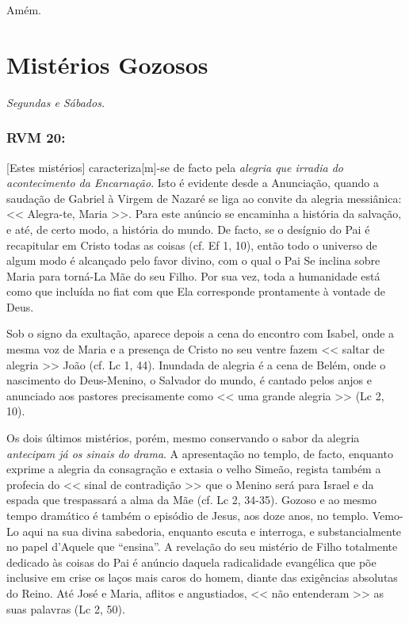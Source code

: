 \documentclass[10pt,a5paper]{book}
\newcommand{\from}[1]{\subsection*{#1}}
\begin{document}
Amém.


\chapter{Mistérios Gozosos}

\emph{Segundas e Sábados.}

\from{RVM 20:}

[Estes mistérios] caracteriza[m]-se de facto pela \emph{alegria que irradia do acontecimento da Encarnação}.
Isto é evidente desde a Anunciação, quando a saudação de Gabriel à Virgem de Nazaré se liga ao convite da alegria messiânica:
<< Alegra-te, Maria >>.
Para este anúncio se encaminha a história da salvação, e até, de certo modo, a história do mundo.
De facto, se o desígnio do Pai é recapitular em Cristo todas as coisas (cf. Ef 1, 10), então todo o
universo de algum modo é alcançado pelo favor divino, com o qual o Pai Se inclina sobre Maria
para torná-La Mãe do seu Filho.
Por sua vez, toda a humanidade está como que incluída no fiat com que Ela corresponde prontamente à vontade de Deus.

Sob o signo da exultação, aparece depois a cena do encontro com Isabel, onde a mesma voz de Maria e a presença de Cristo no seu ventre fazem << saltar de alegria >> João (cf. Lc 1, 44).
Inundada de alegria é a cena de Belém, onde o nascimento do Deus-Menino, o Salvador do mundo, é cantado pelos anjos e anunciado aos pastores precisamente como << uma grande alegria >> (Lc 2, 10).

Os dois últimos mistérios, porém, mesmo conservando o sabor da alegria \emph{antecipam já os sinais do drama}.
A apresentação no templo, de facto, enquanto exprime a alegria da consagração e extasia o velho Simeão, regista também a profecia do << sinal de contradição >> que o Menino será para Israel e da espada que trespassará a alma da Mãe (cf. Lc 2, 34-35).
Gozoso e ao mesmo tempo dramático é também o episódio de Jesus, aos doze anos, no templo.
Vemo-Lo aqui na sua divina sabedoria, enquanto escuta e interroga, e substancialmente no papel d'Aquele que ``ensina''.
A revelação do seu mistério de Filho totalmente dedicado às coisas do Pai é anúncio daquela radicalidade evangélica que põe inclusive em crise os laços mais caros do homem, diante das exigências absolutas do Reino.
Até José e Maria, aflitos e angustiados, << não entenderam >> as suas palavras (Lc 2, 50).
\end{document}
